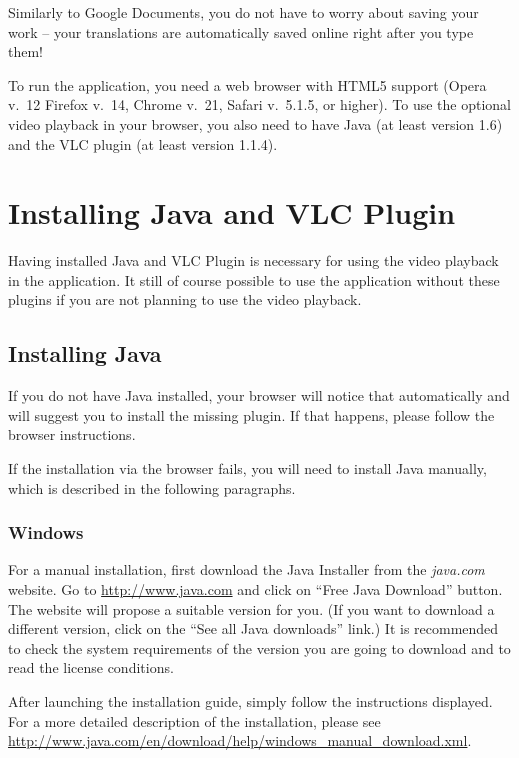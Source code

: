 Similarly to Google Documents, you do not have to worry about saving your work -- your translations are automatically saved online right after you type them!

To run the application, you need a web browser with HTML5 support (Opera v.~12
Firefox v.~14, Chrome v.~21, Safari v.~5.1.5, or higher). To use the optional video playback in your browser, you also need to have Java (at least version 1.6) and the VLC plugin (at least version 1.1.4).

\section{Installing Java and VLC Plugin}
\label{um:sec:installations}

Having installed Java and VLC Plugin is necessary for using the video playback in the application. It still of course possible to use the application without these plugins if you are not planning to use the video playback.

\subsection{Installing Java}

If you do not have Java installed, your browser will notice that automatically and will suggest you to install the missing plugin. If that happens, please follow the browser instructions.

If the installation via the browser fails, you will need to install Java manually, which is described in the following paragraphs.

\subsubsection{Windows}

For a manual installation, first download the Java Installer from the \emph{java.com} website. Go to \url{http://www.java.com} and click on ``Free Java Download'' button. The website will propose a suitable version for you. (If you want to download a different version, click on the ``See all Java downloads'' link.) It is recommended to check the system requirements of the version you are going to download and to read the license conditions.

After launching the installation guide, simply follow the instructions displayed. For a more detailed description of the installation, please see \url{http://www.java.com/en/download/help/windows_manual_download.xml}.

